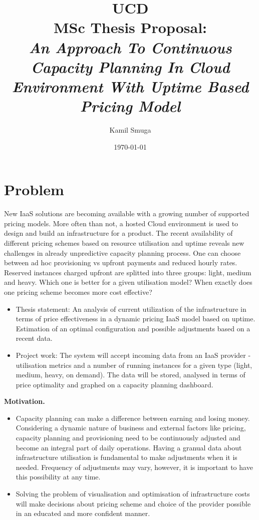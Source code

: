 \documentclass[11pt]{artikel3}
\title{UCD\\MSc Thesis Proposal:\\\emph{An Approach To Continuous Capacity Planning In Cloud Environment With Uptime Based Pricing Model}}
\author{Kamil Smuga}
\date{\today}
\begin{document}
\maketitle


\section{Problem}


New IaaS solutions are becoming available with a growing number of supported pricing models. More often than not, a hosted Cloud environment is used to design and build an infrastructure for a product. The recent availability of different pricing schemes based on resource utilisation and uptime reveals new challenges in already unpredictive capacity planning process. One can choose between ad hoc provisioning vs upfront payments and reduced hourly rates. Reserved instances charged upfront are splitted into three groups: light, medium and heavy. Which one is better for a given utilisation model? When exactly does one pricing scheme becomes more cost effective?


\begin{itemize}
\item Thesis statement: An analysis of current utilization of the infrastructure in terms of price effectiveness in a dynamic pricing IaaS model based on uptime. Estimation of an optimal configuration and possible adjustments based on a recent data.
\item Project work: The system will accept incoming data from an IaaS provider - utilisation metrics and a number of running instances for a given type (light, medium, heavy, on demand). The data will be stored, analysed in terms of price optimality and graphed on a capacity planning dashboard.  
\end{itemize}


{\bf Motivation.}
\begin{itemize}
\item

Capacity planning can make a difference between earning and losing money. Considering a dynamic nature of business and external factors like pricing, capacity planning and provisioning need to be continuously adjusted and become an integral part of daily operations. Having a granual data about infrastructure utilisation is fundamental to make adjustments when it is needed. Frequency of adjustments may vary, however, it is important to have this possibility at any time.
\item Solving the problem of visualisation and optimisation of infrastructure costs will make decisions about pricing scheme and choice of the provider possible in an educated and more confident manner.

\end{itemize}
\end{document}
